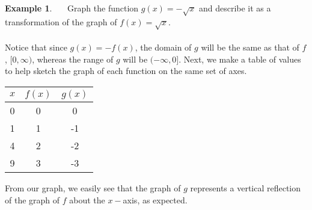 \documentclass[11pt]{book}
\theoremstyle{definition}  %
\newtheorem{example}{Example}[chapter]
\begin{document}
\begin{example}~~~Graph the function $g(x)=-\sqrt{x}$ and describe it as a transformation of the graph of $f(x)=\sqrt{x}$.\\
~\\
Notice that since $g(x)=-f(x)$, the domain of $g$ will be the same as that of $f$, $[0,\infty)$, whereas the range of $g$ will be $(-\infty,0]$.  Next, we make a table of values to help sketch the graph of each function on the same set of axes.

\begin{multicols}{2}
\begin{center}
\begin{tabular}{c||c|c}
$x$ & $f(x)$ &  $g(x)$ \\
\hline
0 & 0 &  0 \\
1 & 1 &  -1 \\
4 & 2 &  -2 \\
9 & 3 &  -3 \\
\end{tabular}
\end{center}

\begin{center}
\end{center}
\end{multicols}

From our graph, we easily see that the graph of $g$ represents a vertical reflection of the graph of $f$ about the $x-$axis, as expected.
\end{example}
\end{document}
